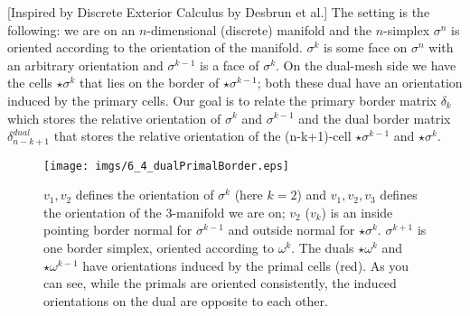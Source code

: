 \begin{appendix}
[Inspired by Discrete Exterior Calculus by Desbrun et al.]
The setting is the following: we are on an $n$-dimensional (discrete) manifold and the $n$-simplex $\sigma^n$ is oriented according to the orientation of the manifold. $\sigma^k$ is some face on $\sigma^n$ with an arbitrary orientation and $\sigma^{k-1}$ is a face of $\sigma^k$. On the dual-mesh side we have the cells $\star \sigma^k$ that lies on the border of $\star \sigma^{k-1}$; both these dual have an orientation induced by the primary cells. Our goal is to relate the primary border matrix $\delta_k$ which stores the relative orientation of $\sigma^k$ and $\sigma^{k-1}$ 
and the dual border matrix $\delta_{n-k+1}^{dual}$ that stores the relative orientation of the (n-k+1)-cell $\star \sigma^{k-1}$ and $\star \sigma^{k}$.

\begin{figure}[h]
\begin{center}
\texttt{[image: imgs/6\_4\_dualPrimalBorder.eps]}
\end{center}
\caption{$v_1,v_2$ defines the orientation of $\sigma^k$ (here $k=2$) and $v_1,v_2,v_3$ defines the orientation of the 3-manifold we are on; $v_2$ ($v_k$) is an inside pointing border normal for $\sigma^{k-1}$ and outside normal for $\star \sigma^k$. $\sigma^{k+1}$ is one border simplex, oriented according to $\omega^k$. The duals $\star \omega^k$ and $\star \omega^{k-1}$ have orientations induced by the primal cells (red). As you can see, while the primals are oriented consistently, the induced orientations on the dual are opposite to each other.}
\end{figure}


\end{appendix}
